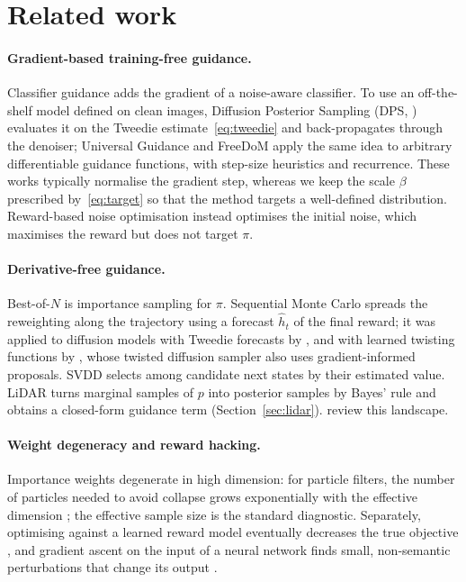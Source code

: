 \documentclass[11pt]{article}
\begin{document}
\section{Related work}
\label{sec:related}

\paragraph{Gradient-based training-free guidance.}
Classifier guidance \citep{dhariwal2021beat} adds the gradient of a noise-aware classifier. To use an off-the-shelf model defined on clean images, Diffusion Posterior Sampling (DPS, \citealp{chung2023dps}) evaluates it on the Tweedie estimate~\eqref{eq:tweedie} and back-propagates through the denoiser; Universal Guidance \citep{bansal2024universal} and FreeDoM \citep{yu2023freedom} apply the same idea to arbitrary differentiable guidance functions, with step-size heuristics and recurrence. These works typically normalise the gradient step, whereas we keep the scale $\beta$ prescribed by~\eqref{eq:target} so that the method targets a well-defined distribution. Reward-based noise optimisation \citep{eyring2024reno} instead optimises the initial noise, which maximises the reward but does not target $\pi$.

\paragraph{Derivative-free guidance.}
Best-of-$N$ is importance sampling for $\pi$. Sequential Monte Carlo \citep{doucet2001smc} spreads the reweighting along the trajectory using a forecast $\hat h_t$ of the final reward; it was applied to diffusion models with Tweedie forecasts by \citet{singhal2025fk}, and with learned twisting functions by \citet{wu2023tds}, whose twisted diffusion sampler also uses gradient-informed proposals. SVDD \citep{li2025svdd} selects among candidate next states by their estimated value. LiDAR \citep{kim2026lidar} turns marginal samples of $p$ into posterior samples by Bayes' rule and obtains a closed-form guidance term (Section~\ref{sec:lidar}). \citet{uehara2025review} review this landscape.

\paragraph{Weight degeneracy and reward hacking.}
Importance weights degenerate in high dimension: for particle filters, the number of particles needed to avoid collapse grows exponentially with the effective dimension \citep{bengtsson2008curse, snyder2008obstacles}; the effective sample size \citep{kong1994ess} is the standard diagnostic. Separately, optimising against a learned reward model eventually decreases the true objective \citep{gao2023overoptimization}, and gradient ascent on the input of a neural network finds small, non-semantic perturbations that change its output \citep{szegedy2014intriguing, goodfellow2015adversarial}.
\end{document}
